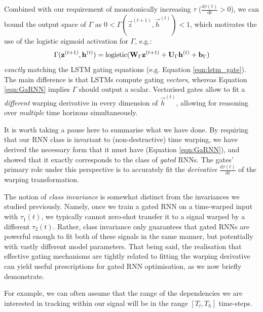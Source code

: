 Combined with our requirement of monotonically increasing $\tau$ ($\frac{\mathrm{d}\tau(t)}{\mathrm{d}t} > 0$), we can bound the output space of $\Gamma$ as $0 < \Gamma(\vec{z}^{(t+1)}, \vec{h}^{(t)}) < 1$, which motivates the use of the logistic sigmoid activation for $\Gamma$, e.g.:
$$
    \Gamma(\vec{z}^{(t+1)}, \vec{h}^{(t)}) = \mathrm{logistic}({\bf W}_\Gamma\vec{z}^{(t+1)} + {\bf U}_\Gamma\vec{h}^{(t)} + \vec{b}_\Gamma)
$$
\emph{exactly} matching the LSTM gating equations (e.g. Equation \ref{eqn:lstm_gate}). The main difference is that LSTMs compute gating \emph{vectors}, whereas Equation \ref{eqn:GaRNN} implies $\Gamma$ should output a scalar. Vectorised gates \citep{hochreiter1991untersuchungen} allow to fit a \emph{different} warping derivative in every dimension of $\vec{h}^{(t)}$, allowing for reasoning over \emph{multiple} time horizons simultaneously.

It is worth taking a pause here to summarise what we have done. By requiring that our RNN class is invariant to (non-destructive) time warping, we have derived the necessary form that it must have (Equation \ref{eqn:GaRNN}), and showed that it exactly corresponds to the class of \emph{gated} RNNs. The gates' primary role under this perspective is to accurately fit the \emph{derivative} $\frac{\mathrm{d}\tau(t)}{\mathrm{d}t}$ of the warping transformation.

The notion of \emph{class invariance} is somewhat distinct from the invariances we studied previously. Namely, once we train a gated RNN on a time-warped input with $\tau_1(t)$, we typically cannot zero-shot transfer it to a  signal warped by a different $\tau_2(t)$. Rather, class invariance only guarantees that gated RNNs are powerful enough to fit both of these signals in the same manner, but potentially with vastly different model parameters. That being said, the realisation that effective gating mechanisms are tightly related to fitting the warping derivative can yield useful prescriptions for gated RNN optimisation, as we now briefly demonstrate.

For example, we can often assume that the range of the dependencies we are interested in tracking within our signal will be in the range $[T_l, T_h]$ time-steps.

